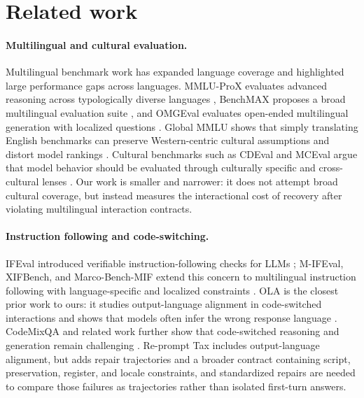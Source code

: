 \section{Related work}

\paragraph{Multilingual and cultural evaluation.}
Multilingual benchmark work has expanded language coverage and highlighted
large performance gaps across languages. MMLU-ProX evaluates advanced reasoning
across typologically diverse languages \citep{xuan2025mmluprox}, BenchMAX
proposes a broad multilingual evaluation suite \citep{huang2025benchmax}, and
OMGEval evaluates open-ended multilingual generation with localized questions
\citep{liu2024omgeval}. Global MMLU shows that simply translating English
benchmarks can preserve Western-centric cultural assumptions and distort model
rankings \citep{singh2024globalmmlu}. Cultural benchmarks such as CDEval and
MCEval argue that model behavior should be evaluated through culturally specific
and cross-cultural lenses \citep{wang2023cdeval,huang2025mceval}. Our work is
smaller and narrower: it does not attempt broad cultural coverage, but instead
measures the interactional cost of recovery after violating multilingual
interaction contracts.

\paragraph{Instruction following and code-switching.}
IFEval introduced verifiable instruction-following checks for LLMs
\citep{zhou2023ifeval}; M-IFEval, XIFBench, and Marco-Bench-MIF extend this
concern to multilingual instruction following with language-specific and
localized constraints
\citep{dussolle2025mifeval,li2025xifbench,zeng2025marcomif}. OLA is the
closest prior work to ours:
it studies output-language alignment in code-switched interactions and shows
that models often infer the wrong response language \citep{oh2026ola}. CodeMixQA
and related work further show that code-switched reasoning and generation remain
challenging \citep{winata2026codemixqa}. Re-prompt Tax includes output-language
alignment, but adds repair trajectories and a broader contract containing
script, preservation, register, and locale constraints, and standardized
repairs are needed to compare those failures as trajectories rather than
isolated first-turn answers.

